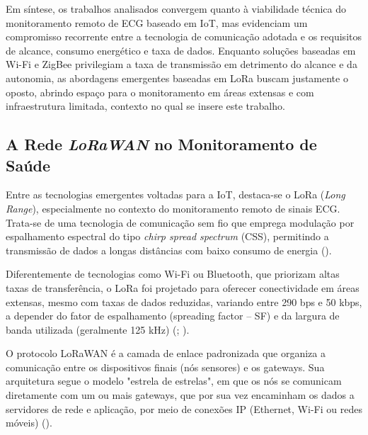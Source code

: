 Em síntese, os trabalhos analisados convergem quanto à viabilidade técnica do monitoramento remoto de \acs{ECG} baseado em \acs{IoT}, mas evidenciam um compromisso recorrente entre a tecnologia de comunicação adotada e os requisitos de alcance, consumo energético e taxa de dados. Enquanto soluções baseadas em Wi-Fi e ZigBee privilegiam a taxa de transmissão em detrimento do alcance e da autonomia, as abordagens emergentes baseadas em LoRa buscam justamente o oposto, abrindo espaço para o monitoramento em áreas extensas e com infraestrutura limitada, contexto no qual se insere este trabalho.







\subsection{A Rede \textit{LoRaWAN} no Monitoramento de Saúde}


Entre as tecnologias emergentes voltadas para a \acs{IoT}, destaca-se o LoRa (\textit{Long Range}), especialmente no contexto do monitoramento remoto de sinais \acs{ECG}. Trata-se de uma tecnologia de comunicação sem fio que emprega modulação por espalhamento espectral do tipo \textit{chirp spread spectrum} (CSS), permitindo a transmissão de dados a longas distâncias com baixo consumo de energia (). 

Diferentemente de tecnologias como Wi-Fi ou Bluetooth, que priorizam altas taxas de transferência, o LoRa foi projetado para oferecer conectividade em áreas extensas, mesmo com taxas de dados reduzidas, variando entre 290 bps e 50 kbps, a depender do fator de espalhamento (spreading factor – SF) e da largura de banda utilizada (geralmente 125 kHz) (; ).

O protocolo LoRaWAN é a camada de enlace padronizada que organiza a comunicação entre os dispositivos finais (nós sensores) e os gateways. Sua arquitetura segue o modelo "estrela de estrelas", em que os nós se comunicam diretamente com um ou mais gateways, que por sua vez encaminham os dados a servidores de rede e aplicação, por meio de conexões IP (Ethernet, Wi-Fi ou redes móveis) (). 


